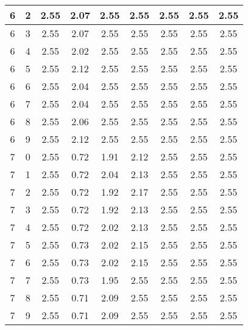 \begin{longtable}{|c|c||c||c|c|c||c|c|c|}
	6 & 2 & 2.55 & 2.07 & 2.55 & 2.55 & 2.55 & 2.55 & 2.55 \\ \hline
	6 & 3 & 2.55 & 2.07 & 2.55 & 2.55 & 2.55 & 2.55 & 2.55 \\ \hline
	6 & 4 & 2.55 & 2.02 & 2.55 & 2.55 & 2.55 & 2.55 & 2.55 \\ \hline
	6 & 5 & 2.55 & 2.12 & 2.55 & 2.55 & 2.55 & 2.55 & 2.55 \\ \hline
	6 & 6 & 2.55 & 2.04 & 2.55 & 2.55 & 2.55 & 2.55 & 2.55 \\ \hline
	6 & 7 & 2.55 & 2.04 & 2.55 & 2.55 & 2.55 & 2.55 & 2.55 \\ \hline
	6 & 8 & 2.55 & 2.06 & 2.55 & 2.55 & 2.55 & 2.55 & 2.55 \\ \hline
	6 & 9 & 2.55 & 2.12 & 2.55 & 2.55 & 2.55 & 2.55 & 2.55 \\ \hline
	7 & 0 & 2.55 & 0.72 & 1.91 & 2.12 & 2.55 & 2.55 & 2.55 \\ \hline
	7 & 1 & 2.55 & 0.72 & 2.04 & 2.13 & 2.55 & 2.55 & 2.55 \\ \hline
	7 & 2 & 2.55 & 0.72 & 1.92 & 2.17 & 2.55 & 2.55 & 2.55 \\ \hline
	7 & 3 & 2.55 & 0.72 & 1.92 & 2.13 & 2.55 & 2.55 & 2.55 \\ \hline
	7 & 4 & 2.55 & 0.72 & 2.02 & 2.13 & 2.55 & 2.55 & 2.55 \\ \hline
	7 & 5 & 2.55 & 0.73 & 2.02 & 2.15 & 2.55 & 2.55 & 2.55 \\ \hline
	7 & 6 & 2.55 & 0.73 & 2.02 & 2.15 & 2.55 & 2.55 & 2.55 \\ \hline
	7 & 7 & 2.55 & 0.73 & 1.95 & 2.55 & 2.55 & 2.55 & 2.55 \\ \hline
	7 & 8 & 2.55 & 0.71 & 2.09 & 2.55 & 2.55 & 2.55 & 2.55 \\ \hline
	7 & 9 & 2.55 & 0.71 & 2.09 & 2.55 & 2.55 & 2.55 & 2.55 \\ \hline
\end{longtable}
\clearpage{}
